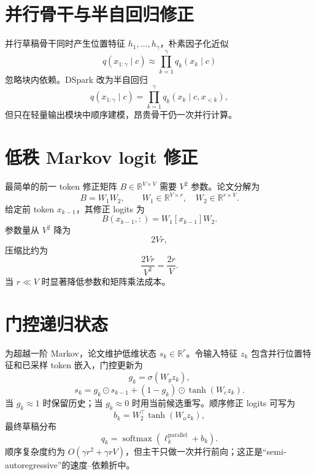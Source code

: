 \documentclass[UTF8,12pt,a4paper,fontset=none]{ctexart}
\numberwithin{equation}{section}
\newcommand{\R}{\mathbb{R}}
\newcommand{\softmax}{\operatorname{softmax}}
\begin{document}
\section{并行骨干与半自回归修正}
并行草稿骨干同时产生位置特征 $h_1,\ldots,h_\gamma$，朴素因子化近似
\begin{equation}
 q(x_{1:\gamma}\mid c)
 \approx\prod_{k=1}^{\gamma}q_k(x_k\mid c)
\end{equation}
忽略块内依赖。DSpark 改为半自回归
\begin{equation}
 \boxed{
 q(x_{1:\gamma}\mid c)
 =\prod_{k=1}^{\gamma}q_k(x_k\mid c,x_{<k}),
 }
\end{equation}
但只在轻量输出模块中顺序建模，昂贵骨干仍一次并行计算。

\section{低秩 Markov logit 修正}
最简单的前一 token 修正矩阵 $B\in\R^{V\times V}$ 需要 $V^2$ 参数。论文分解为
\begin{equation}
 \boxed{B=W_1W_2,\qquad W_1\in\R^{V\times r},\quad W_2\in\R^{r\times V}.}
\end{equation}
给定前 token $x_{k-1}$，其修正 logits 为
\begin{equation}
 B(x_{k-1},:)=W_1[x_{k-1}]W_2.
\end{equation}
参数量从 $V^2$ 降为
\begin{equation}
 2Vr,
\end{equation}
压缩比约为
\begin{equation}
 \frac{2Vr}{V^2}=\frac{2r}{V}.
\end{equation}
当 $r\ll V$ 时显著降低参数和矩阵乘法成本。

\section{门控递归状态}
为超越一阶 Markov，论文维护低维状态 $s_k\in\R^r$。令输入特征 $z_k$ 包含并行位置特征和已采样 token 嵌入，门控更新为
\begin{equation}
 g_k=\sigma(W_gz_k),
\end{equation}
\begin{equation}
 \boxed{
 s_k=g_k\odot s_{k-1}+(1-g_k)\odot\tanh(W_cz_k).
 }
\end{equation}
当 $g_k\approx1$ 时保留历史；当 $g_k\approx0$ 时用当前候选重写。顺序修正 logits 可写为
\begin{equation}
 b_k=W_2^\top\tanh(W_oz_k),
\end{equation}
最终草稿分布
\begin{equation}
 q_k=\softmax(\ell_k^{\mathrm{parallel}}+b_k).
\end{equation}
顺序复杂度约为 $O(\gamma r^2+\gamma rV)$，但主干只做一次并行前向；这正是“semi-autoregressive”的速度--依赖折中。
\end{document}
